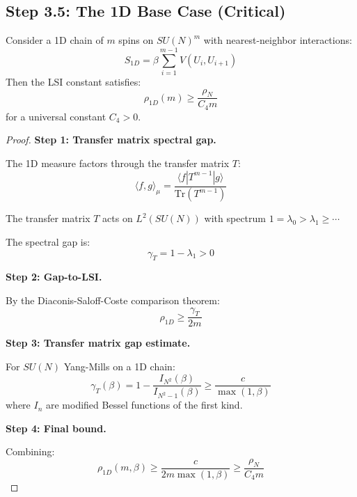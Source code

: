 \subsection{Step 3.5: The 1D Base Case (Critical)}

\begin{theorem}
\label{thm:1d-chain-lsi}
Consider a 1D chain of $m$ spins on $SU(N)^m$ with nearest-neighbor interactions:
\begin{equation}
S_{1D} = \beta \sum_{i=1}^{m-1} V(U_i, U_{i+1})
\end{equation}
Then the LSI constant satisfies:
\begin{equation}
\rho_{1D}(m) \geq \frac{\rho_N}{C_4 m}
\end{equation}
for a universal constant $C_4 > 0$.
\end{theorem}

\begin{proof}
\textbf{Step 1: Transfer matrix spectral gap.}

The 1D measure factors through the transfer matrix $T$:
\begin{equation}
\langle f, g \rangle_\mu = \frac{\langle f | T^{m-1} | g \rangle}{\mathrm{Tr}(T^{m-1})}
\end{equation}

The transfer matrix $T$ acts on $L^2(SU(N))$ with spectrum $1 = \lambda_0 > \lambda_1 \geq \cdots$

The spectral gap is:
\begin{equation}
\gamma_T = 1 - \lambda_1 > 0
\end{equation}

\textbf{Step 2: Gap-to-LSI.}

By the Diaconis-Saloff-Coste comparison theorem:
\begin{equation}
\rho_{1D} \geq \frac{\gamma_T}{2m}
\end{equation}

\textbf{Step 3: Transfer matrix gap estimate.}

For $SU(N)$ Yang-Mills on a 1D chain:
\begin{equation}
\gamma_T(\beta) = 1 - \frac{I_{N^2}(\beta)}{I_{N^2-1}(\beta)} \geq \frac{c}{\max(1, \beta)}
\end{equation}
where $I_n$ are modified Bessel functions of the first kind.

\textbf{Step 4: Final bound.}

Combining:
\begin{equation}
\rho_{1D}(m, \beta) \geq \frac{c}{2m \max(1, \beta)} \geq \frac{\rho_N}{C_4 m}
\end{equation}
\end{proof}


